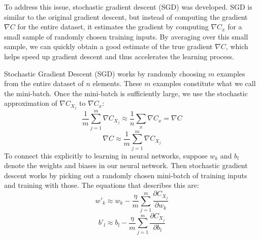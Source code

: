 \documentclass[../main]{subfiles}
\begin{document}
To address this issue, stochastic gradient descent (SGD) was developed. SGD is similar to the original gradient descent, but instead of computing the gradient \(\nabla C\) for the entire dataset, it estimates the gradient by computing \(\nabla C_x\) for a small sample of randomly chosen training inputs. By averaging over this small sample, we can quickly obtain a good estimate of the true gradient \(\nabla C\), which helps speed up gradient descent and thus accelerates the learning process.

Stochastic Gradient Descent (SGD) works by randomly choosing \( m \) examples from the entire dataset of \( n \) elements. These \( m \) examples constitute what we call the mini-batch. Once the mini-batch is sufficiently large, we use the stochastic approximation of \(\nabla C_{X_j}\) to \(\nabla C_x\):
\begin{equation*}
    \frac{1}{m}\sum_{j=1}^{m} \nabla C_{X_j}\approx \frac{1}{n}\sum_{x} \nabla C_x = \nabla C
\end{equation*}
\begin{equation*}
    \nabla C \approx  \frac{1}{m}\sum_{j=1}^{m} \nabla C_{X_j} 
\end{equation*}
To connect this explicitly to learning in neural networks, suppose $w_k$ and $b_l$ denote the weights and biases in our neural network. Then stochastic gradient descent works by picking out a randomly chosen mini-batch of training inputs and training with those. The equations that describes this are:
\begin{equation*}
    w'_k \approx w_k - \frac{\eta}{m} \sum_{j=1}^{m}\frac{\partial C_{X_j}}{\partial w_k}
\end{equation*}
\begin{equation*}
    b'_l \approx b_l - \frac{\eta}{m} \sum_{j=1}^{m}\frac{\partial C_{X_j}}{\partial b_l}
\end{equation*}
\end{document}
